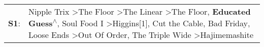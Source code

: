 \begin{supertabular}{p{0.03\textwidth}p{0.92\textwidth}}
 \textbf{S1}:  &  Nipple Trix\textsuperscript{} \textgreater \enspace The Floor\textsuperscript{} \textgreater \enspace The Linear\textsuperscript{} \textgreater \enspace The Floor\textsuperscript{}, \enspace \textbf{Educated Guess\textsuperscript{$\wedge$}}, \enspace Soul Food I\textsuperscript{} \textgreater \enspace Higgins[1]\textsuperscript{}, \enspace Cut the Cable\textsuperscript{}, \enspace Bad Friday\textsuperscript{}, \enspace Loose Ends\textsuperscript{} \textgreater \enspace Out Of Order\textsuperscript{}, \enspace The Triple Wide\textsuperscript{} \textgreater \enspace Hajimemashite\textsuperscript{}  \enspace  \\
\end{supertabular}
